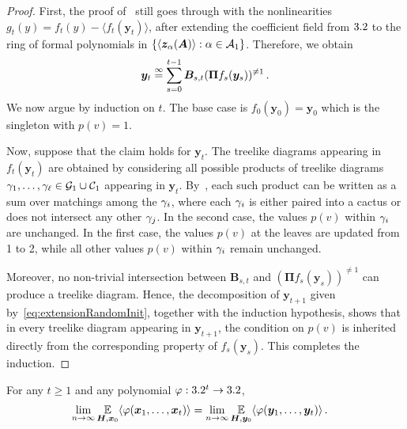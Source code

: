 \begin{proof}
    First, the proof of~ still goes through with the nonlinearities $g_t(y) = f_t(y) - \langle f_t(\bm y_t)\rangle$, after extending the coefficient field from $3.2$ to the ring of formal polynomials in $\{\langle \bm z_{\alpha}(\bm A)\rangle : \alpha\in {\cal A}_1\}$. Therefore, we obtain
    \begin{align}
         \bm y_t \overset{\infty}{=} \sum_{s=0}^{t-1} \bm B_{s,t} (\bm \Pi  f_s(\bm y_s))^{\neq 1}\,.\label{eq:extensionRandomInit}
    \end{align}
    We now argue by induction on $t$. The base case is $f_0(\bm y_0)=\bm y_0$ which is the singleton with $p(v) = 1$.
    
    Now, suppose that the claim holds for $\bm y_t$.
    The treelike diagrams appearing in $f_t(\bm y_t)$ are obtained by considering all possible products of treelike diagrams $\gamma_1, \dots, \gamma_\ell \in {\cal G}_1 \cup {\cal C}_1$ appearing in $\bm y_t$. 
    By~, each such product can be written as a sum over matchings among the $\gamma_i$, where each $\gamma_i$ is either paired into a cactus or does not intersect any other $\gamma_j$. 
    In the second case, the values $p(v)$ within $\gamma_i$ are unchanged.
    In the first case, the values $p(v)$ at the leaves are updated from 1 to 2, while all other values $p(v)$ within $\gamma_i$ remain unchanged.

    Moreover, no non-trivial intersection between $\bm B_{s,t}$ and $(\bm \Pi f_s(\bm y_s))^{\neq 1}$ can produce a treelike diagram. Hence, the decomposition of $\bm y_{t+1}$ given by~\cref{eq:extensionRandomInit}, together with the induction hypothesis, shows that in every treelike diagram appearing in $\bm y_{t+1}$, the condition on $p(v)$ is inherited directly from the corresponding property of $f_s(\bm y_s)$.
    This completes the induction.
\end{proof}

\begin{lemma}\label{lem:puncToUnpunc}
    For any $t\ge 1$ and any polynomial $\varphi:3.2^t \to 3.2$,
    \begin{align*}
        \lim_{n\to\infty} \operatorname*{\mathbb{E}}_{\bm H,\bm x_0} \langle \varphi(\bm x_1, \ldots, \bm x_t)\rangle &= \lim_{n\to\infty} \operatorname*{\mathbb{E}}_{\bm H,\bm y_0} \langle \varphi(\bm y_1, \ldots, \bm y_t)\rangle\,.
    \end{align*}
\end{lemma}


